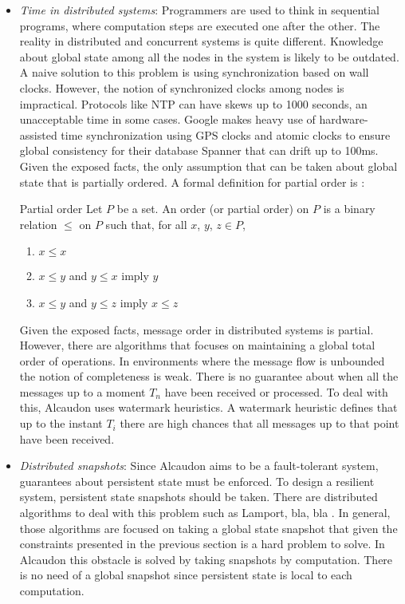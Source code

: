\begin{itemize}
\item \textit{Time in distributed systems}:
  Programmers are used to think in sequential programs, where computation steps
  are executed one after the other. The reality in distributed and concurrent
  systems is quite different. Knowledge about global state among all the nodes
  in the system is likely to be outdated. A naive solution to this problem is
  using synchronization based on wall clocks. However, the notion of
  synchronized clocks among nodes is impractical. Protocols like NTP\cite{ntp}
  can have skews up to 1000 seconds, an unacceptable time in some cases. Google
  makes heavy use of hardware-assisted time synchronization using GPS clocks and
  atomic clocks to ensure global consistency for their database
  Spanner\cite{180268} that can drift up to 100ms. Given the exposed facts, the
  only assumption that can be taken about global state that is partially
  ordered. A formal definition for partial order is \cite{book:lattices}:
  \begin{definition}{Partial order}
    Let $P$ be a set. An order (or partial order) on $P$ is a binary relation
    $\leq$ on $P$ such that, for all $x$, $y$, $z \in P$,
    \begin{enumerate}
    \item $x \leq x$
    \item $x \leq y$ and $y \leq x$ imply $y$
    \item $x \leq y$ and $y \leq z$ imply $x \leq z$
    \end{enumerate}
  \end{definition}
  Given the exposed facts, message order in distributed systems is partial.
  However, there are algorithms that focuses on maintaining a global total order
  of operations\cite{orderops}. In environments where the message flow is unbounded
  the notion of completeness is weak. There is no guarantee about when all the
  messages up to a moment $T_n$ have been received or processed. To deal with
  this, Alcaudon uses watermark heuristics. A watermark heuristic defines that up
  to the instant $T_i$ there are high chances that all messages up to that point
  have been received.
\item \textit{Distributed snapshots}:
  Since Alcaudon aims to be a fault-tolerant system, guarantees about persistent
  state must be enforced. To design a resilient system, persistent state
  snapshots should be taken. There are distributed algorithms to deal with this
  problem such as Lamport, bla, bla . In general, those algorithms are focused
  on taking a global state snapshot that given the constraints presented in the
  previous section is a hard problem to solve. In Alcaudon this obstacle is
  solved by taking snapshots by computation. There is no need of a global
  snapshot since persistent state is local to each computation.


\end{itemize}
